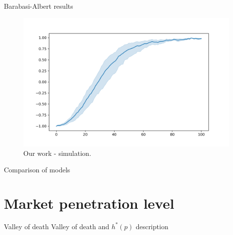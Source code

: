 \documentclass[10pt]{beamer}
\begin{document}
\begin{frame}{Barabasi-Albert results}
	\begin{figure}
		\includegraphics[width=\textwidth]{../results/images/example.png}
		\caption{Our work - simulation.}
	\end{figure}
\end{frame}

\begin{frame}{Comparison of models}
	
\end{frame}

\section{Market penetration level}

\begin{frame}{Valley of death}
	Valley of death and $h^*(p)$ description
\end{frame}
\end{document}
